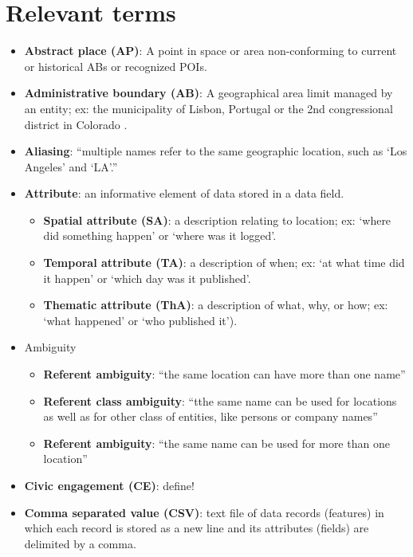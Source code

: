 
\section{Relevant terms} \label{appendix:terms}
\begin{itemize}
	\item[] \textbf{Abstract place (AP)}: A point in space or area non-conforming to current or historical ABs or recognized POIs.
	\item[] \textbf{Administrative boundary (AB)}: A geographical area limit managed by an entity; ex: the municipality of Lisbon, Portugal or the 2nd congressional district in Colorado .
	\item[] \textbf{Aliasing}: {“multiple names refer to the same geographic location, such as ‘Los Angeles’ and ‘LA’.''\cite{Teitler2008}}
	\item[] \textbf{Attribute}: an informative element of data stored in a data field. 
	\begin{itemize}
		\item[] \textbf{Spatial attribute (SA)}: a description relating to location; ex: ‘where did something happen’ or ‘where was it logged’.
		\item[] \textbf{Temporal attribute (TA)}: a description of when; ex: ‘at what time did it happen’ or ‘which day was it published’. 
		\item[] \textbf{Thematic attribute (ThA)}: a description of what, why, or how; ex: ‘what happened’ or ‘who published it’).
	\end{itemize}
	\item[] Ambiguity
	\begin{itemize}
		\item[] \textbf{Referent ambiguity}: {``the same location can have more than one name''\cite{Silva2006}}
		\item[] \textbf{Referent class ambiguity}: {``tthe same name can be used for locations as well as for other class of entities, like persons or company names''\cite{Silva2006}}
		\item[] \textbf{Referent ambiguity}: {``the same name can be used for more than one location''\cite{Silva2006}}
	\end{itemize}
	\item[] \textbf{Civic engagement (CE)}: {\color{red} define!}\cite{Acedo2019}
	\item[] \textbf{Comma separated value (CSV)}: text file of data records (features) in which each record is stored as a new line and its attributes (fields) are delimited by a comma.

\end{itemize}

